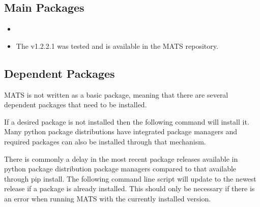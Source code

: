 \documentclass[letterpaper,10pt,english]{sphinxmanual}
\begin{document}
\subsection{Main Packages}
\label{\detokenize{Getting Started:main-packages}}\begin{itemize}
\item {} 
\sphinxAtStartPar
{}

\item {} 
\sphinxAtStartPar
{}   The v1.2.2.1 was tested and is available in the MATS repository.

\end{itemize}


\subsection{Dependent Packages}
\label{\detokenize{Getting Started:dependent-packages}}
\sphinxAtStartPar
MATS is not written as a basic package, meaning that there are several dependent packages that need to be installed.

\sphinxAtStartPar
If a desired package is not installed then the following command will install it.  Many python package distributions have integrated package managers and required packages can also be installed through that mechanism.

\begin{sphinxVerbatim}[commandchars=\\\{\}]
  
\end{sphinxVerbatim}

\sphinxAtStartPar
There is commonly a delay in the most recent package releases available in python package distribution package managers compared to that available through pip install.  The following command line script will update to the newest release if a package is already installed.  This should only be necessary if there is an error when running MATS with the currently installed version.

\begin{sphinxVerbatim}[commandchars=\\\{\}]
      
\end{sphinxVerbatim}
\end{document}
